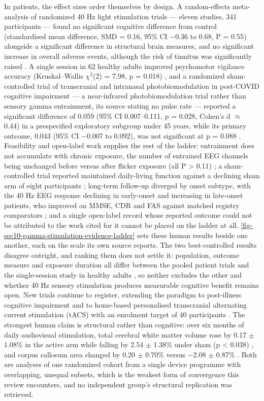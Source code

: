 \documentclass[11pt]{article}
\begin{document}
In patients, the effect sizes order themselves by design. A random-effects meta-analysis of randomized 40 Hz light stimulation trials --- eleven studies, 341 participants --- found no significant cognitive difference from control (standardised mean difference, SMD = 0.16, 95\% CI $-$0.36 to 0.68, P = 0.55) alongside a significant difference in structural brain measures, and no significant increase in overall adverse events, although the risk of tinnitus was significantly raised \citep{Ang2025}. A single session in 62 healthy adults improved psychomotor vigilance accuracy (Kruskal--Wallis $\chi$$^{2}$(2) = 7.98, p = 0.018) \citep{Attokaren2026}, and a randomized sham-controlled trial of transcranial and intranasal photobiomodulation in post-COVID cognitive impairment --- a near-infrared photobiomodulation trial rather than sensory gamma entrainment, its source stating no pulse rate --- reported a significant difference of 0.059 (95\% CI 0.007--0.111, p = 0.028, Cohen's d $\approx$ 0.44) in a prespecified exploratory subgroup under 45 years, while its primary outcome, 0.043 (95\% CI $-$0.007 to 0.092), was not significant at p = 0.088 \citep{Lim2026}. Feasibility and open-label work supplies the rest of the ladder: entrainment does not accumulate with chronic exposure, the number of entrained EEG channels being unchanged before versus after flicker exposure (all P > 0.11) \citep{He2021}; a sham-controlled trial reported maintained daily-living function against a declining sham arm of eight participants \citep{Cimenser2021}; long-term follow-up diverged by onset subtype, with the 40 Hz EEG response declining in early-onset and increasing in late-onset patients, who improved on MMSE, CDR and FAS against matched registry comparators \citep{Chan2025}; and a single open-label record whose reported outcome could not be attributed to the work cited for it \citep{Yamada2026} cannot be placed on the ladder at all. \ref{fig-sec10-gamma-stimulation-evidence-ladder} sets these human results beside one another, each on the scale its own source reports. The two best-controlled results disagree outright, and ranking them does not settle it: population, outcome measure and exposure duration all differ between the pooled patient trials \citep{Ang2025} and the single-session study in healthy adults \citep{Attokaren2026}, so neither excludes the other and whether 40 Hz sensory stimulation produces measurable cognitive benefit remains open. New trials continue to register, extending the paradigm to post-illness cognitive impairment \citep{Fu2026} and to home-based personalised transcranial alternating current stimulation (tACS) with an enrolment target of 40 participants \citep{Brechet2026}. The strongest human claim is structural rather than cognitive: over six months of daily audiovisual stimulation, total cerebral white matter volume rose by 0.17 $\pm$ 1.08\% in the active arm while falling by 2.54 $\pm$ 1.38\% under sham (p < 0.038) \citep{Da2024a}, and corpus callosum area changed by 0.20 $\pm$ 0.70\% versus $-$2.08 $\pm$ 0.87\% \citep{Da2024b}. Both are analyses of one randomized cohort from a single device programme with overlapping, unequal subsets, which is the weakest form of convergence this review encounters, and no independent group's structural replication was retrieved.
\end{document}
